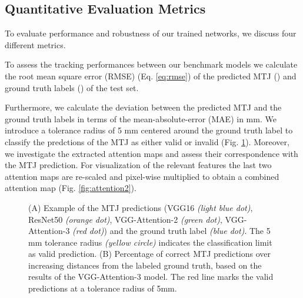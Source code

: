 \documentclass[letterpaper, 10 pt, conference]{ieeeconf}
\begin{document}
\subsection{Quantitative Evaluation Metrics}
To evaluate performance and robustness of our trained networks, we discuss four different metrics.

To assess the tracking performances between our benchmark models we calculate the root mean square error (RMSE) (Eq. \ref{eq:rmse}) of the predicted MTJ () and ground truth labels () of the test set.


Furthermore, we calculate the deviation between the predicted MTJ and the ground truth labels in terms of the mean-absolute-error (MAE) in mm. We introduce a tolerance radius of 5 mm centered around the ground truth label to classify the predctions of the MTJ as either valid or invalid (Fig. \ref{fig:tolerance}).
Moreover, we investigate the extracted attention maps and assess their correspondence with the MTJ prediction. For visualization of the relevant features the last two attention maps are re-scaled and  pixel-wise multiplied to obtain a combined attention map (Fig. \ref{fig:attention2}).
\begin{figure}[thpb]
    \centering
    \caption{(A) Example of the MTJ predictions (VGG16 \textit{(light blue dot)}, ResNet50 \textit{(orange dot)}, VGG-Attention-2 \textit{(green dot)}, VGG-Attention-3 \textit{(red dot)}) and the ground truth label \textit{(blue dot)}. The 5 mm tolerance radius \textit{(yellow circle)} indicates the classification limit as valid prediction. (B) Percentage of correct MTJ predictions over increasing distances from the labeled ground truth, based on the results of the VGG-Attention-3 model. The red line marks the valid predictions at a tolerance radius of 5mm.}
    \label{fig:tolerance}
\end{figure}
\begin{figure*}[thpb]
   \centering
    \caption{Results of test sample 1 (TS 1) in the upper row and test sample 2 (TS 2) in the lower row calculated with the VGG-Attention-3 model: (A) MTJ prediction \textit{(red dot)} and ground truth \textit{(blue dot)} (B) Overlay of attention map with original image (C) Combined attention map. TS 1 shows that the attention module neglects distortions in the image.}
    \label{fig:attention2}
\end{figure*}
\end{document}

